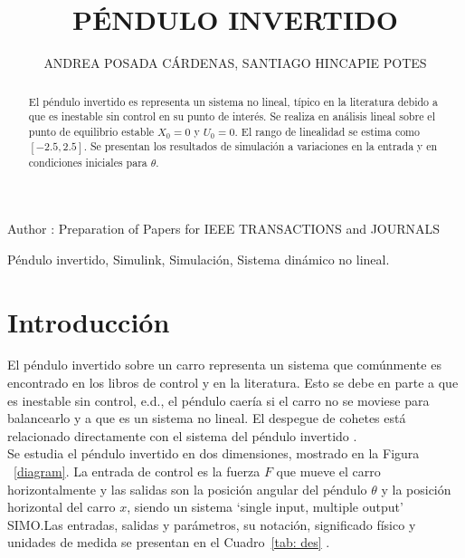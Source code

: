 \documentclass{ieeeaccess}
\begin{document}

\title{PÉNDULO INVERTIDO}
\author{\uppercase{Andrea Posada Cárdenas},
  \uppercase{Santiago Hincapie Potes}}
\address[1]{Estudiante de Ingeniería Matemática, Universidad EAFIT,
  Medellin, Colombia (e-mail: aposad31@eafit.edu.co)}
\address[2]{Estudiante de Ingeniería Matemática, Universidad EAFIT,
  Medellin, Colombia (e-mail: shinca12@eafit.edu.co)}

\markboth{}
{Author \headeretal: Preparation of Papers for IEEE TRANSACTIONS and JOURNALS}


\begin{abstract}
  El péndulo invertido es representa un sistema no lineal, típico en la literatura debido a que es inestable sin control en su punto de interés. Se realiza en análisis lineal sobre el punto de equilibrio estable $X_0=0$ y $U_0=0$. El rango de linealidad se estima como $[-2.5,2.5]$. Se presentan los resultados de simulación a variaciones en la entrada y en condiciones iniciales para $\theta$.
\end{abstract}

\begin{keywords}
  Péndulo invertido, Simulink, Simulación, Sistema dinámico no lineal.
\end{keywords}

\titlepgskip=-15pt

\maketitle

\section{Introducción}\label{sec:introduction}

El péndulo invertido sobre un carro representa un sistema que comúnmente es encontrado en los libros de control y en la literatura. Esto se debe en parte a que es inestable sin control, e.d., el péndulo caería si el carro no se moviese para balancearlo y a que es un sistema no lineal. El despegue de cohetes está relacionado directamente con el sistema del péndulo invertido \cite{pag}.\\

Se estudia el péndulo invertido en dos dimensiones, mostrado en la Figura ~\ref{diagram}. La entrada de control es la fuerza $F$ que mueve el carro horizontalmente y las salidas son la posición angular del péndulo $\theta$ y la posición horizontal del carro $x$, siendo un sistema `single input, multiple output' SIMO.\@ Las entradas, salidas y parámetros, su notación, significado físico y unidades de medida se presentan en el Cuadro~\ref{tab: des} \cite{pag}.
\end{document}
